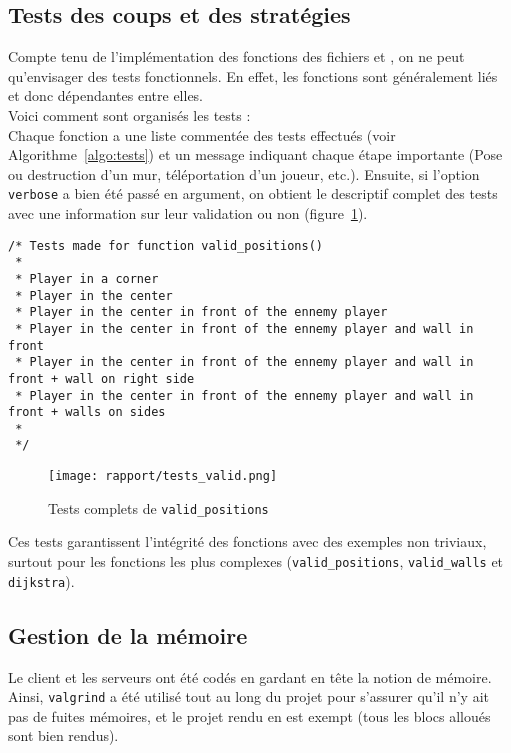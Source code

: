 \documentclass[a4paper]{article}
\begin{document}
\subsection{Tests des coups et des stratégies}

Compte tenu de l'implémentation des fonctions des fichiers  et , on ne peut qu'envisager des tests fonctionnels. En effet, les fonctions sont généralement liés et donc dépendantes entre elles. \\

Voici comment sont organisés les tests : \\
Chaque fonction a une liste commentée des tests effectués (voir Algorithme~\ref{algo:tests}) et un message indiquant chaque étape importante (Pose ou destruction d'un mur, téléportation d'un joueur, etc.). Ensuite, si l'option \texttt{verbose}  a bien été passé en argument, on obtient le descriptif complet des tests avec une information sur leur validation ou non (figure~\ref{fig:tests_verbose}). \\

\begin{lstlisting}[caption = {Tests décris pour la fonction \texttt{valid\_positions()}}, label={algo:tests}]
/* Tests made for function valid_positions()
 *
 * Player in a corner
 * Player in the center
 * Player in the center in front of the ennemy player
 * Player in the center in front of the ennemy player and wall in front
 * Player in the center in front of the ennemy player and wall in front + wall on right side
 * Player in the center in front of the ennemy player and wall in front + walls on sides
 *
 */
\end{lstlisting}

\begin{figure}[ht]
    \centering
    \texttt{[image: rapport/tests\_valid.png]}
    \caption{Tests complets de \texttt{valid\_positions}}
    \label{fig:tests_verbose}
\end{figure}

Ces tests garantissent l'intégrité des fonctions avec des exemples non triviaux, surtout pour les fonctions les plus complexes (\texttt{valid\_positions}, \texttt{valid\_walls} et \texttt{dijkstra}).

\subsection{Gestion de la mémoire}

Le client et les serveurs ont été codés en gardant en tête la notion de mémoire. Ainsi, \texttt{valgrind} a été utilisé tout au long du projet pour s'assurer qu'il n'y ait pas de fuites mémoires, et le projet rendu en est exempt (tous les blocs alloués sont bien rendus). \\
\end{document}
